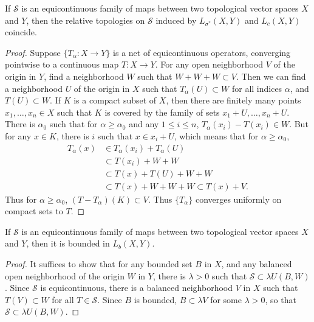 \begin{theorem}
    If $\mathcal{S}$ is an equicontinuous family of maps between two topological vector spaces $X$ and $Y$, then the relative topologies on $\mathcal{S}$ induced by $L_{\sigma^*}(X,Y)$ and $L_c(X,Y)$ coincide.
\end{theorem}
\begin{proof}
    Suppose $\{ T_\alpha: X \to Y \}$ is a net of equicontinuous operators, converging pointwise to a continuous map $T: X \to Y$. For any open neighborhood $V$ of the origin in $Y$, find a neighborhood $W$ such that $W + W + W \subset V$. Then we can find a neighborhood $U$ of the origin in $X$ such that $T_\alpha(U) \subset W$ for all indices $\alpha$, and $T(U) \subset W$. If $K$ is a compact subset of $X$, then there are finitely many points $x_1,\dots,x_n \in X$ such that $K$ is covered by the family of sets $x_1 + U, \dots, x_n + U$. There is $\alpha_0$ such that for $\alpha \geq \alpha_0$ and any $1 \leq i \leq n$, $T_\alpha(x_i) - T(x_i) \in W$. But for any $x \in K$, there is $i$ such that $x \in x_i + U$, which means that for $\alpha \geq \alpha_0$,
    \begin{align*}
        T_\alpha(x) &\in T_\alpha(x_i) + T_\alpha(U)\\
        &\subset T(x_i) + W + W\\
        &\subset T(x) + T(U) + W + W\\
        &\subset T(x) + W + W + W \subset T(x) + V.
    \end{align*}
    Thus for $\alpha \geq \alpha_0$, $(T - T_\alpha)(K) \subset V$. Thus $\{ T_\alpha \}$ converges uniformly on compact sets to $T$.
\end{proof}

\begin{theorem}
    If $\mathcal{S}$ is an equicontinuous family of maps between two topological vector spaces $X$ and $Y$, then it is bounded in $L_b(X,Y)$.
\end{theorem}
\begin{proof}
    It suffices to show that for any bounded set $B$ in $X$, and any balanced open neighborhood of the origin $W$ in $Y$, there is $\lambda > 0$ such that $\mathcal{S} \subset \lambda U(B,W)$. Since $\mathcal{S}$ is equicontinuous, there is a balanced neighborhood $V$ in $X$ such that $T(V) \subset W$ for all $T \in \mathcal{S}$. Since $B$ is bounded, $B \subset \lambda V$ for some $\lambda > 0$, so that $\mathcal{S} \subset \lambda U(B,W)$.
\end{proof}

